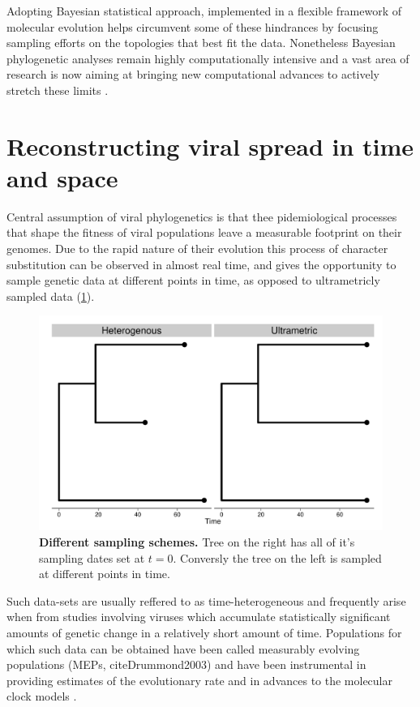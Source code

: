 \documentclass[12pt,twoside]{mitthesis}
\theoremstyle{plain}
\theoremstyle{definition}
\theoremstyle{remark}
\begin{document}
Adopting Bayesian statistical approach, implemented in a flexible framework of molecular evolution \citep{Drummond2012} helps circumvent some of these hindrances by focusing sampling efforts on the topologies 
that best fit the data.
Nonetheless Bayesian phylogenetic analyses remain highly computationally intensive and a vast area of research is now aiming at bringing new computational advances to actively stretch these limits \citep{Suchard2009}.

\section{Reconstructing viral spread in time and space}

Central assumption of viral phylogenetics is that thee pidemiological processes that shape the fitness of viral populations leave a measurable footprint on their genomes.
Due to the rapid nature of their evolution this process of character substitution can be observed in almost real time, and gives the opportunity to sample genetic data at different points in time, as opposed to ultrametricly sampled data (\ref{fig:ultrametric}).

\begin{figure}[h]
\begin{center}
\includegraphics[scale=0.35]{ultrametric} 
\end{center}
\caption{{ \footnotesize {\bf Different sampling schemes.} 
Tree on the right has all of it's sampling dates set at $t=0$. Conversly the tree on the left is sampled at different points in time.
}}
\label{fig:ultrametric}
\end{figure}

Such data-sets are usually reffered to as time-heterogeneous and frequently arise when from studies involving viruses which accumulate statistically significant amounts of genetic change in a relatively short amount of time.
Populations for which such data can be obtained have been called measurably evolving populations (MEPs, cite{Drummond2003}) and have been instrumental in providing  estimates of the evolutionary rate and in advances to the molecular clock models \citep{Drummond2006}.
\end{document}
